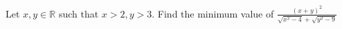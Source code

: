 Let $x,y\in\mathbb{R}$ such that $x>2, y>3$. Find the minimum value of $\frac{(x+y)^2}{\sqrt{x^2-4}+\sqrt{y^2-9}}$